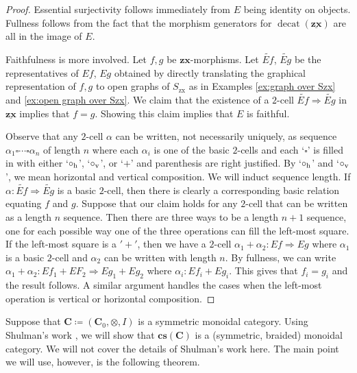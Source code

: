\documentclass[11pt]{amsart}
\newcommand{\cat}[1]{\mathbf{#1}}
\renewcommand{\t}[1]{\textup{#1}}
\newcommand{\from}{\colon}
\theoremstyle{remark}
\theoremstyle{definition}
\newcommand{\zx}{_{\text{zx}}}
\newcommand{\bicat}[1]{\underline{\mathbf{#1}}}
\begin{document}
\begin{proof}
	Essential surjectivity follows immediately from $E$ being identity on objects.  Fullness follows from the fact that the morphism generators for $\operatorname{decat}(\bicat{zx})$ are all in the image of $E$. 
	
	Faithfulness is more involved. Let $f,g$ be $\cat{zx}$-morphisms. Let $\widetilde{Ef}$, $\widetilde{Eg}$ be the representatives of $Ef$, $Eg$ obtained by directly translating the graphical representation of $f,g$ to open graphs of $S\zx$ as in Examples \ref{ex:graph over Szx}  and \ref{ex:open graph over Szx}. We claim that the existence of a $2$-cell $\widetilde{Ef} \Rightarrow \widetilde{Eg}$ in $\bicat{zx}$ implies that $f=g$.  Showing this claim implies that $E$ is faithful. 
	
	Observe that any $2$-cell $\alpha$ can be written, not necessarily uniquely, as sequence $\alpha_1 \square \dotsm \square \alpha_n$ of length $n$ where each $\alpha_i$ is one of the basic $2$-cells and each `$\square$' is filled in with either `$\circ_\t{h}$', `$\circ_\t{v}$', or `$+$' and parenthesis are right justified. By `$\circ_\t{h}$' and `$\circ_\t{v}$', we mean horizontal and vertical composition. We will induct sequence length.  If $\alpha \from \widetilde{Ef} \Rightarrow \widetilde{Eg}$ is a basic $2$-cell, then there is clearly a corresponding basic relation equating $f$ and $g$.  Suppose that our claim holds for any $2$-cell that can be written as a length $n$ sequence.  Then there are three ways to be a length $n+1$ sequence, one for each possible way one of the three operations can fill the left-most square.  If the left-most square is a $'+'$, then we have a $2$-cell $\alpha_1 + \alpha_2 \from Ef \Rightarrow Eg$ where $\alpha_1$ is a basic $2$-cell and $\alpha_2$ can be written with length $n$.   By fullness, we can write $\alpha_1 + \alpha_2 \from Ef_1 + EF_2 \Rightarrow Eg_1 + Eg_2$ where $\alpha_i \from Ef_i + Eg_i$.   This gives that $f_i = g_i$  and the result follows.  A similar argument handles the cases when the left-most operation is vertical or horizontal composition.
\end{proof}

\appendix
\label{sec:appendix}

Suppose that $\cat{C} \coloneqq (\cat{C}_0, \otimes, I)$ is a symmetric monoidal category.  Using Shulman's work \cite{Shul}, we will show that $\cat{cs}(\cat{C})$ is a (symmetric, braided) monoidal category. We will not cover the details of Shulman's work here.  The main point we will use, however, is the following theorem.
\end{document}
